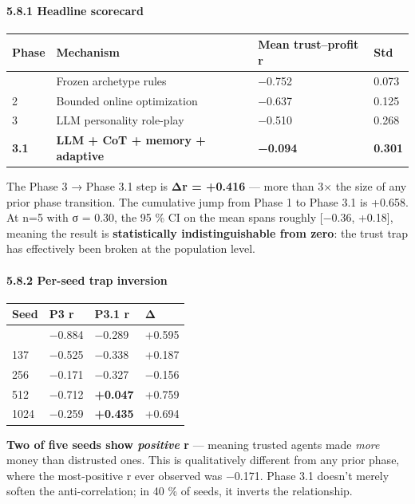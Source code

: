 \documentclass[
]{article}
\begin{document}
\hypertarget{headline-scorecard-2}{%
\paragraph{5.8.1 Headline scorecard}\label{headline-scorecard-2}}

\begin{longtable}[]{@{}llll@{}}
\toprule\noalign{}
Phase & Mechanism & Mean trust--profit r & Std \\
\midrule\noalign{}
\endhead
\bottomrule\noalign{}
\endlastfoot
1 & Frozen archetype rules & −0.752 & 0.073 \\
2 & Bounded online optimization & −0.637 & 0.125 \\
3 & LLM personality role-play & −0.510 & 0.268 \\
\textbf{3.1} & \textbf{LLM + CoT + memory + adaptive} & \textbf{−0.094}
& \textbf{0.301} \\
\end{longtable}

The Phase 3 → Phase 3.1 step is \textbf{Δr = +0.416} --- more than 3×
the size of any prior phase transition. The cumulative jump from Phase 1
to Phase 3.1 is +0.658. At n=5 with σ = 0.30, the 95 \% CI on the mean
spans roughly {[}−0.36, +0.18{]}, meaning the result is
\textbf{statistically indistinguishable from zero}: the trust trap has
effectively been broken at the population level.

\hypertarget{per-seed-trap-inversion}{%
\paragraph{5.8.2 Per-seed trap
inversion}\label{per-seed-trap-inversion}}

\begin{longtable}[]{@{}llll@{}}
\toprule\noalign{}
Seed & P3 r & P3.1 r & Δ \\
\midrule\noalign{}
\endhead
\bottomrule\noalign{}
\endlastfoot
42 & −0.884 & −0.289 & +0.595 \\
137 & −0.525 & −0.338 & +0.187 \\
256 & −0.171 & −0.327 & −0.156 \\
512 & −0.712 & \textbf{+0.047} & +0.759 \\
1024 & −0.259 & \textbf{+0.435} & +0.694 \\
\end{longtable}

\textbf{Two of five seeds show \emph{positive} r} --- meaning trusted
agents made \emph{more} money than distrusted ones. This is
qualitatively different from any prior phase, where the most-positive r
ever observed was −0.171. Phase 3.1 doesn't merely soften the
anti-correlation; in 40 \% of seeds, it inverts the relationship.
\end{document}
